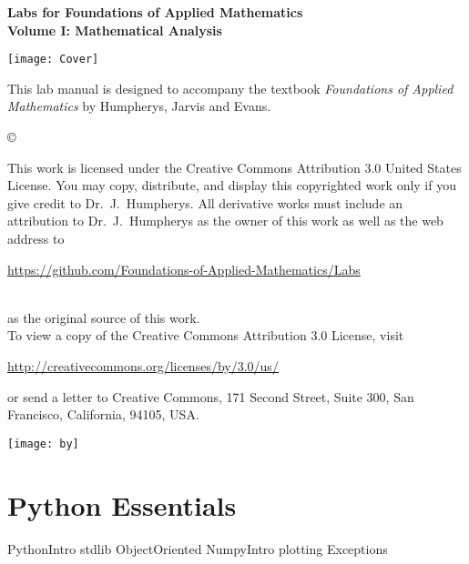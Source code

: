 \documentclass[nociteref]{SIAM-GH-book}
\begin{document}

\thispagestyle{empty} %

\begin{center} 
{\huge \bf Labs for Foundations of Applied Mathematics} \\
\vspace{5mm}
{\Large \bf Volume I: Mathematical Analysis}
\vspace{20mm}

\texttt{[image: Cover]}
\end{center}
\frontmatter



\begin{thepreface} %

This lab manual is designed to accompany the textbook \emph{Foundations of Applied Mathematics} by Humpherys, Jarvis and Evans.

\vfill
\copyright{This work is licensed under the Creative Commons Attribution 3.0 United States
License.  You may copy, distribute, and display this copyrighted work only if you give
credit to Dr.~J.~Humpherys. All derivative works must include an attribution to Dr.~J.~Humpherys as the owner of this work as well as the web address to
\\\centerline{\url{https://github.com/Foundations-of-Applied-Mathematics/Labs}}\\as the original source of this work.
\\To view a copy of the Creative Commons Attribution 3.0 License, visit
\\\centerline{\url{http://creativecommons.org/licenses/by/3.0/us/}} or send a letter to Creative Commons, 171 Second Street, Suite 300, San Francisco, California, 94105, USA.}

\vfill
\centering\texttt{[image: by]}
\vfill
\end{thepreface}

\setcounter{tocdepth}{1}
\tableofcontents

\mainmatter %

\part{Python Essentials} %
{PythonIntro}
{stdlib}
{ObjectOriented}
{NumpyIntro}
{plotting}
{Exceptions}
\end{document}

